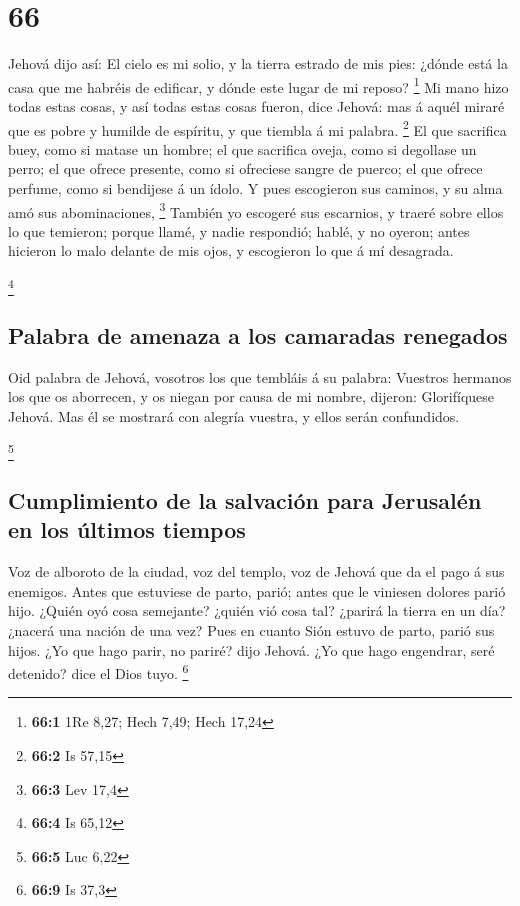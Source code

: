 \hypertarget{section-65}{%
\section{66}\label{section-65}}

 Jehová dijo así: El cielo es mi solio, y la tierra
estrado de mis pies: ¿dónde está la casa que me habréis de edificar, y
dónde este lugar de mi reposo? \footnote{\textbf{66:1} 1Re 8,27; Hech
  7,49; Hech 17,24}  Mi mano hizo todas estas cosas, y así
todas estas cosas fueron, dice Jehová: mas á aquél miraré que es pobre y
humilde de espíritu, y que tiembla á mi palabra. \footnote{\textbf{66:2}
  Is 57,15}  El que sacrifica buey, como si matase un
hombre; el que sacrifica oveja, como si degollase un perro; el que
ofrece presente, como si ofreciese sangre de puerco; el que ofrece
perfume, como si bendijese á un ídolo. Y pues escogieron sus caminos, y
su alma amó sus abominaciones, \footnote{\textbf{66:3} Lev 17,4}
 También yo escogeré sus escarnios, y traeré sobre ellos
lo que temieron; porque llamé, y nadie respondió; hablé, y no oyeron;
antes hicieron lo malo delante de mis ojos, y escogieron lo que á mí
desagrada.

\footnote{\textbf{66:4} Is 65,12}

\hypertarget{palabra-de-amenaza-a-los-camaradas-renegados}{%
\subsection{Palabra de amenaza a los camaradas
renegados}\label{palabra-de-amenaza-a-los-camaradas-renegados}}

 Oid palabra de Jehová, vosotros los que tembláis á su
palabra: Vuestros hermanos los que os aborrecen, y os niegan por causa
de mi nombre, dijeron: Glorifíquese Jehová. Mas él se mostrará con
alegría vuestra, y ellos serán confundidos.

\footnote{\textbf{66:5} Luc 6,22}

\hypertarget{cumplimiento-de-la-salvaciuxf3n-para-jerusaluxe9n-en-los-uxfaltimos-tiempos}{%
\subsection{Cumplimiento de la salvación para Jerusalén en los últimos
tiempos}\label{cumplimiento-de-la-salvaciuxf3n-para-jerusaluxe9n-en-los-uxfaltimos-tiempos}}

 Voz de alboroto de la ciudad, voz del templo, voz de
Jehová que da el pago á sus enemigos.  Antes que estuviese
de parto, parió; antes que le viniesen dolores parió hijo.
 ¿Quién oyó cosa semejante? ¿quién vió cosa tal? ¿parirá
la tierra en un día? ¿nacerá una nación de una vez? Pues en cuanto Sión
estuvo de parto, parió sus hijos.  ¿Yo que hago parir, no
pariré? dijo Jehová. ¿Yo que hago engendrar, seré detenido? dice el Dios
tuyo. \footnote{\textbf{66:9} Is 37,3}

